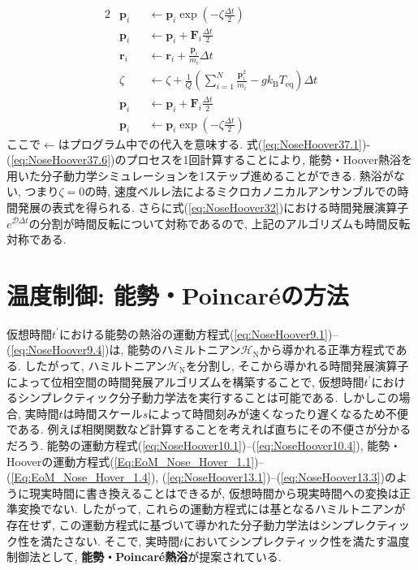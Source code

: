 \begin{alignat}{2}
 &\bm{p}_{i} &&\gets \bm{p}_{i} \exp \left(-\zeta \frac{\Delta t}{2}\right)
 \label{eq:NoseHoover37.1}
 \\
 &\bm{p}_{i} &&\gets \bm{p}_{i} + \bm{F}_{i} \frac{\Delta t}{2}
 \label{eq:NoseHoover37.2}
 \\
 &\bm{r}_{i} &&\gets \bm{r}_{i} + \frac{\bm{p}_{i}}{m_{i}} \Delta t
 \label{eq:NoseHoover37.3}
 \\
 &\zeta          &&\gets \zeta
                           + \frac{1}{Q}
                           \left(
                           \sum_{i=1}^{N} \frac{\bm{p}_{i}^{2}}{m_{i}}
                           - g k_{\mathrm{B}} T_{\mathrm{eq}}
                           \right) \Delta t
 \label{eq:NoseHoover37.4}
 \\
 &\bm{p}_{i} &&\gets \bm{p}_{i} + \bm{F}_{i} \frac{\Delta t}{2}
 \label{eq:NoseHoover37.5}
 \\
 &\bm{p}_{i} &&\gets \bm{p}_{i} \exp \left(-\zeta \frac{\Delta t}{2}\right)
 \label{eq:NoseHoover37.6}
\end{alignat}
ここで$\gets$はプログラム中での代入を意味する.
式(\ref{eq:NoseHoover37.1})-(\ref{eq:NoseHoover37.6})のプロセスを1回計算することにより, 能勢・Hoover熱浴を用いた分子動力学シミュレーションを1ステップ進めることができる.
熱浴がない, つまり$\zeta=0$の時, 速度ベルレ法によるミクロカノニカルアンサンブルでの時間発展の表式を得られる.
さらに式(\ref{eq:NoseHoover32})における時間発展演算子$e^{\mathcal{D} \Delta t}$の分割が時間反転について対称であるので, 上記のアルゴリズムも時間反転対称である.

\section{温度制御: 能勢・Poincar\'{e}の方法}
仮想時間$t^{\prime}$における能勢の熱浴の運動方程式(\ref{eq:NoseHoover9.1})--(\ref{eq:NoseHoover9.4})は, 能勢のハミルトニアン$\mathcal{H}_{\mathrm{N}}$から導かれる正準方程式である.
したがって, ハミルトニアン$\mathcal{H}_{\mathrm{N}}$を分割し, そこから導かれる時間発展演算子によって位相空間の時間発展アルゴリズムを構築することで, 仮想時間$t^{\prime}$におけるシンプレクティック分子動力学法を実行することは可能である. しかしこの場合, 実時間$t$は時間スケール$s$によって時間刻みが速くなったり遅くなるため不便である. 例えば相関関数など計算することを考えれば直ちにその不便さが分かるだろう. 能勢の運動方程式(\ref{eq:NoseHoover10.1})--(\ref{eq:NoseHoover10.4}), 能勢・Hooverの運動方程式(\ref{Eq:EoM_Nose_Hover_1.1})--(\ref{Eq:EoM_Nose_Hover_1.4}), (\ref{eq:NoseHoover13.1})--(\ref{eq:NoseHoover13.3})のように現実時間に書き換えることはできるが, 仮想時間から現実時間への変換は正準変換でない. したがって, これらの運動方程式には基となるハミルトニアンが存在せず, この運動方程式に基づいて導かれた分子動力学法はシンプレクティック性を満たさない. そこで, 実時間$t$においてシンプレクティック性を満たす温度制御法として, \textbf{能勢・Poincar\'{e}熱浴}が提案されている.

